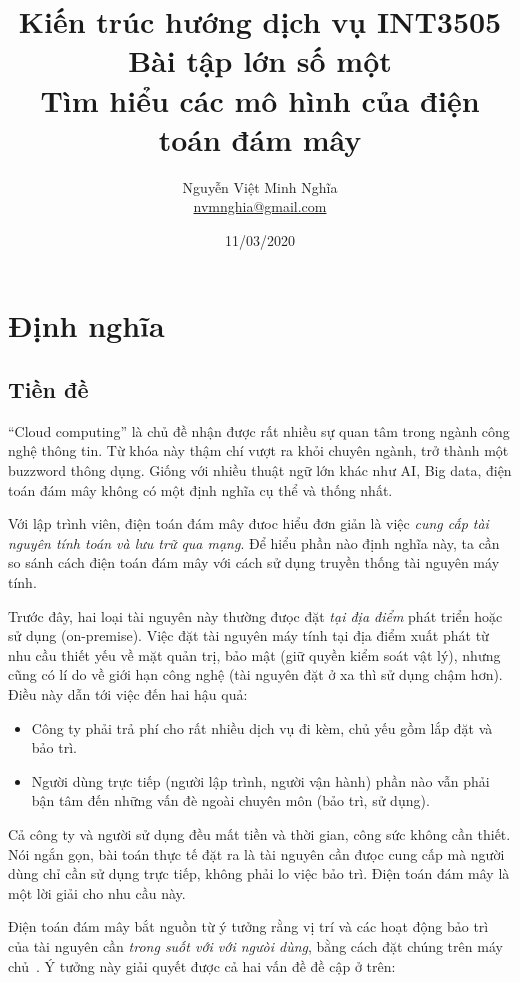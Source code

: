 \documentclass{article}
\author{Nguyễn Việt Minh Nghĩa \\ \href{mailto:nvmnghia@gmail.com}{nvmnghia@gmail.com}}
\date{11/03/2020}
\title{Kiến trúc hướng dịch vụ INT3505 \\ Bài tập lớn số một \\ Tìm hiểu các mô hình của điện toán đám mây}
\begin{document}
\maketitle

\section{Định nghĩa}

\subsection{Tiền đề}

``Cloud computing'' là chủ đề nhận được rất nhiều sự quan tâm trong ngành công
nghệ thông tin. Từ khóa này thậm chí vượt ra khỏi chuyên ngành, trở thành một
buzzword thông dụng. Giống với nhiều thuật ngữ lớn khác như AI, Big data, điện
toán đám mây không có một định nghĩa cụ thể và thống nhất.

Với lập trình viên, điện toán đám mây đưoc hiểu đơn giản là việc \emph{cung cấp
tài nguyên tính toán và lưu trữ qua mạng}. Để hiểu phần nào định nghĩa này, ta
cần so sánh cách điện toán đám mây với cách sử dụng truyền thống tài nguyên máy
tính.

Trước đây, hai loại tài nguyên này thường đưọc đặt \emph{tại địa điểm} phát
triển hoặc sử dụng (on-premise). Việc đặt tài nguyên máy tính tại địa điểm xuất
phát từ nhu cầu thiết yếu về mặt quản trị, bảo mật (giữ quyền kiểm soát vật lý),
nhưng cũng có lí do về giới hạn công nghệ (tài nguyên đặt ở xa thì sử dụng chậm
hơn). Điều này dẫn tới việc đến hai hậu quả:

\begin{itemize}
    \item Công ty phải trả phí cho rất nhiều dịch vụ đi kèm, chủ yếu gồm lắp đặt
        và bảo trì.
    \item Người dùng trực tiếp (người lập trình, người vận hành) phần nào vẫn
        phải bận tâm đến những vấn đè ngoài chuyên môn (bảo trì, sử dụng).
\end{itemize}

Cả công ty và người sử dụng đều mất tiền và thời gian, công sức không cần thiết.
Nói ngắn gọn, bài toán thực tế đặt ra là tài nguyên cần đưọc cung cấp mà người
dùng chỉ cần sử dụng trực tiếp, không phải lo việc bảo trì. Điện toán đám mây là
một lời giải cho nhu cầu này.

Điện toán đám mây bắt nguồn từ ý tưởng rằng vị trí và các hoạt động bảo trì của
tài nguyên cần \emph{trong suốt với với ngưòi dùng}, bằng cách đặt chúng trên
máy chủ~\cite{SES2006}. Ý tưởng này giải quyết được cả hai vấn đề đề cập ở trên:
\end{document}
